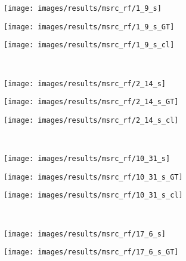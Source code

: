 \begin{figure}[t]
 \centering
 \begin{subfigure}[c]{0.24\textwidth}
  \centering
  \texttt{[image: images/results/msrc\_rf/1\_9\_s]}
 \end{subfigure}
 \begin{subfigure}[c]{0.24\textwidth}
  \centering
  \texttt{[image: images/results/msrc\_rf/1\_9\_s\_GT]}
 \end{subfigure}
 \begin{subfigure}[c]{0.24\textwidth}
  \centering
  \texttt{[image: images/results/msrc\_rf/1\_9\_s\_cl]}
 \end{subfigure}
 \\
 \begin{subfigure}[c]{0.24\textwidth}
  \centering
  \texttt{[image: images/results/msrc\_rf/2\_14\_s]}
 \end{subfigure}
 \begin{subfigure}[c]{0.24\textwidth}
  \centering
  \texttt{[image: images/results/msrc\_rf/2\_14\_s\_GT]}
 \end{subfigure}
 \begin{subfigure}[c]{0.24\textwidth}
  \centering
  \texttt{[image: images/results/msrc\_rf/2\_14\_s\_cl]}
 \end{subfigure}
 \\
 \begin{subfigure}[c]{0.24\textwidth}
  \centering
  \texttt{[image: images/results/msrc\_rf/10\_31\_s]}
 \end{subfigure}
 \begin{subfigure}[c]{0.24\textwidth}
  \centering
  \texttt{[image: images/results/msrc\_rf/10\_31\_s\_GT]}
 \end{subfigure}
 \begin{subfigure}[c]{0.24\textwidth}
  \centering
  \texttt{[image: images/results/msrc\_rf/10\_31\_s\_cl]}
 \end{subfigure}
 \\
 \begin{subfigure}[c]{0.24\textwidth}
  \centering
  \texttt{[image: images/results/msrc\_rf/17\_6\_s]}
 \end{subfigure}
 \begin{subfigure}[c]{0.24\textwidth}
  \centering
  \texttt{[image: images/results/msrc\_rf/17\_6\_s\_GT]}
 \end{subfigure}
 \begin{subfigure}[c]{0.24\textwidth}

\end{subfigure}
\end{figure}
